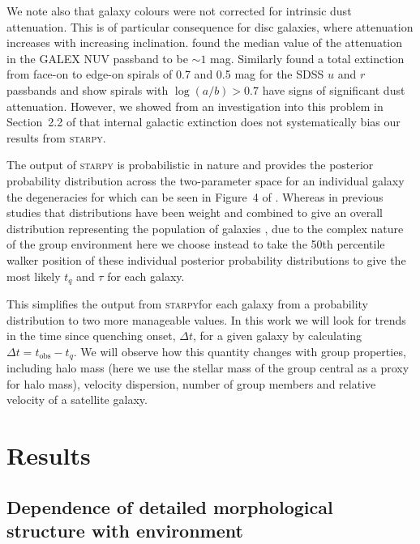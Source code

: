 \documentclass[useAMS,usenatbib]{mn2e}
\def\starpy ~{\textsc{starpy}}
\begin{document}
We note also that galaxy colours were not corrected for intrinsic dust attenuation. This is of particular consequence for disc galaxies, where attenuation increases with increasing inclination. \cite{Buat05} found the median value of the attenuation in the GALEX NUV passband to be $\sim 1$ mag. Similarly \cite{masters10c} found a total extinction from face-on to edge-on spirals of 0.7 and 0.5 mag for the SDSS $u$ and $r$ passbands and show spirals with $\log(a/b) > 0.7$ have signs of significant dust attenuation. However, we showed from an investigation into this problem in Section~2.2 of \citet{smethurst16} that internal galactic extinction does not systematically bias our results from \starpy~. 

The output of \starpy  ~ is probabilistic in nature and provides the posterior probability distribution across the two-parameter space for an individual galaxy the degeneracies for which can be seen in Figure~4 of \citet{smethurst15}.  Whereas in previous studies that distributions have been weight and combined to give an overall distribution representing the population of galaxies \citep[see][]{smethurst15, smethurst16}, due to the complex nature of the group environment here we choose instead to take the 50th percentile walker position of these individual posterior probability distributions to give the most likely $t_{q}$ and $\tau$ for each galaxy. \

This simplifies the output from \starpy  ~for each galaxy from a probability distribution to two more manageable values. In this work we will look for trends in the time since quenching onset, $\Delta t$, for a given galaxy by calculating {\bf $\Delta t = t_\mathrm{obs} - t_{q}$}. We will observe how this quantity changes with group properties, including halo mass (here we use the stellar mass of the group central as a proxy for halo mass), velocity dispersion, number of group members and relative velocity of a satellite galaxy. 

\section{Results}\label{sec:results}
\subsection{Dependence of detailed morphological structure with environment}
\end{document}
